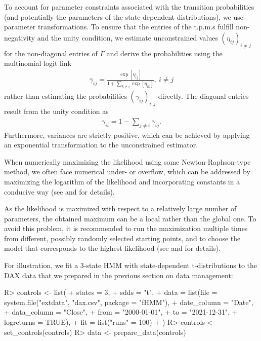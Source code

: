 \documentclass[article]{jss}
\begin{document}
To account for parameter constraints associated with the transition probabilities (and potentially the parameters of the state-dependent distributions), we use parameter transformations. To ensure that the entries of the t.p.m.s fulfill non-negativity and the unity condition, we estimate unconstrained values $(\eta_{ij})_{i\neq j}$ for the non-diagonal entries of $\Gamma$ and derive the probabilities using the multinomial logit link
\begin{align*}
\gamma_{ij}=\frac{\exp[\eta_{ij}]}{1+\sum_{k\neq i}\exp[\eta_{ik}]},~i\neq j
\end{align*}
rather than estimating the probabilities $(\gamma_{ij})_{i,j}$ directly. The diagonal entries result from the unity condition as
\begin{align*}
\gamma_{ii}=1-\sum_{j\neq i}\gamma_{ij}.
\end{align*}
Furthermore, variances are strictly positive, which can be achieved by applying an exponential transformation to the unconstrained estimator.

When numerically maximizing the likelihood using some Newton-Raphson-type method, we often face numerical under- or overflow, which can be addressed by maximizing the logarithm of the likelihood and incorporating constants in a conducive way (see \cite{zuc16} and \cite{oel21} for details).

As the likelihood is maximized with respect to a relatively large number of parameters, the obtained maximum can be a local rather than the global one. To avoid this problem, it is recommended to run the maximization multiple times from different, possibly randomly selected starting points, and to choose the model that corresponds to the highest likelihood (see \cite{zuc16} and \cite{oel21} for details).

For illustration, we fit a 3-state HMM with state-dependent t-distributions to the DAX data that we prepared in the previous section on data management:

%
\begin{Schunk}
\begin{Sinput}
R> controls <- list(
+    states = 3,
+    sdds   = "t",
+    data   = list(file        = system.file("extdata", "dax.csv", package = "fHMM"),
+                  date_column = "Date",
+                  data_column = "Close",
+                  from        = "2000-01-01",
+                  to          = "2021-12-31",
+                  logreturns  = TRUE),
+    fit    = list("runs" = 100)
+  )
R> controls <- set_controls(controls)
R> data <- prepare_data(controls)
\end{Sinput}
\end{Schunk}
%
\end{document}
